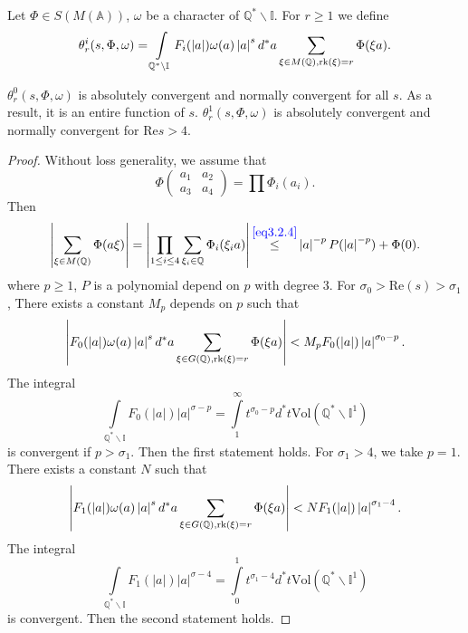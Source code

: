 \begin{definition}
Let $\Phi\in S(M(\mathbb A))$, $\omega$ be a character of $\mathbb Q^*\backslash \mathbb I$. For $r\ge 1$ we define
\[
\theta ^i_r(s,\Phi,\omega)= \int\limits_{\mathbb Q^*\backslash \mathbb I} F_i(\left |a\right |) \omega(a) \left |a \right |^s d^*a \sum\limits_{\xi\in M(\mathbb Q), \mathrm{rk} (\xi) =r}\Phi(\xi a).
\]
\end{definition}

\begin{lemma}\label{62}
$\theta_r^0 (s,\Phi,\omega)$ is absolutely convergent and normally convergent for all $s$. As a result, it is an entire function of $s$.
$\theta_r^1 (s,\Phi,\omega)$ is absolutely convergent and normally convergent for $\mathrm {Re} s>4$.
\end{lemma}

\begin{proof}
Without loss generality, we assume that
\[
\Phi\left ( \begin{array} {cc}
a_1 & a_2\\
a_3 & a_4
\end{array} \right )
=\prod\Phi_i(a_i).
\]
Then
\[
\left |\sum\limits_{\xi \in M(\mathbb Q)} \Phi(a\xi )\right |=\left |\prod\limits_{1\le i\le 4} \sum\limits_{\xi_i\in \mathbb Q}\Phi_i(\xi_i a)\right | \mathop{\le}\limits^{\textcolor{blue}{\ref{eq3.2.4}}} \left |a\right |^{-p}P(\left |a \right |^{-p}) + \Phi(0).
\]
where $p\ge 1$, $P$ is a polynomial depend on $p$ with degree $3$. For $\sigma_0 >\mathrm {Re} (s)> \sigma_1$, There exists a constant $M_p$ depends on $p$ such that
\[
\left |F_0(\left |a\right |) \omega(a) \left |a \right |^s d^*a \sum\limits_{\xi\in G(\mathbb Q), \mathrm{rk} (\xi) =r}\Phi(\xi a)\right |
 < M_pF_0(\left |a\right |)\left |a \right |^{\sigma_0 -p}.
\]
The integral
\[
\int\limits_{\mathbb Q^*\backslash \mathbb I} F_0(\left | a \right |) \left | a \right |^{\sigma-p}=\int\limits_1^\infty  t^{\sigma_0 -p} d^* t \mathrm {Vol} ( \mathbb Q^* \backslash \mathbb I^1)
\]
is convergent if $p >\sigma_1$. Then the first statement holds. For $\sigma_1 >4$, we take $p=1$. There exists a constant $N$ such that
\[
\left |F_1(\left |a\right |) \omega(a) \left |a \right |^s d^*a \sum\limits_{\xi\in G(\mathbb Q), \mathrm{rk} (\xi) =r}\Phi(\xi a)\right |
< N F_1(\left |a\right |)\left |a \right |^{\sigma_1-4}.
\]
The integral
\[
\int\limits_{\mathbb Q^*\backslash \mathbb I} F_1(\left | a \right |) \left | a \right |^{\sigma-4}=\int\limits_0^1  t^{\sigma_1 -4} d^* t \mathrm {Vol} ( \mathbb Q^* \backslash \mathbb I^1)
\]
is convergent. Then the second statement holds.
\end{proof}

